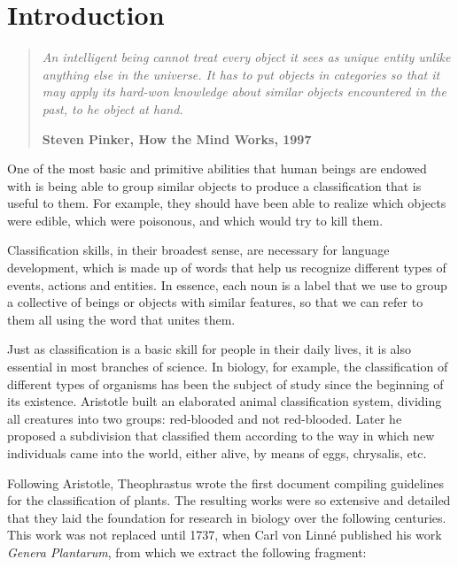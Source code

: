 
\chapter{Introduction}\label{ch:introduction}

\begin{quotation}{\slshape
		An intelligent being cannot treat every object it sees as unique entity unlike anything else in the universe. It has to put objects in categories so that it may apply its hard-won knowledge about similar objects encountered in the past, to he object at hand.}
		\begin{flushright}
			\textbf{Steven Pinker, How the Mind Works, 1997} 
		\end{flushright}
\end{quotation}

One of the most basic and primitive abilities that human beings are endowed with is being able to group similar objects to produce a classification that is useful to them. For example, they should have been able to realize which objects were edible, which were poisonous, and which would try to kill them.

Classification skills, in their broadest sense, are necessary for language development, which is made up of words that help us recognize different types of events, actions and entities. In essence, each noun is a label that we use to group a collective of beings or objects with similar features, so that we can refer to them all using the word that unites them.

Just as classification is a basic skill for people in their daily lives, it is also essential in most branches of science. In biology, for example, the classification of different types of organisms has been the subject of study since the beginning of its existence. Aristotle built an elaborated animal classification system, dividing all creatures into two groups: red-blooded and not red-blooded. Later he proposed a subdivision that classified them according to the way in which new individuals came into the world, either alive, by means of eggs, chrysalis, etc.

Following Aristotle, Theophrastus wrote the first document compiling guidelines for the classification of plants. The resulting works were so extensive and detailed that they laid the foundation for research in biology over the following centuries. This work was not replaced until 1737, when Carl von Linné published his work \textit{Genera Plantarum}, from which we extract the following fragment:

